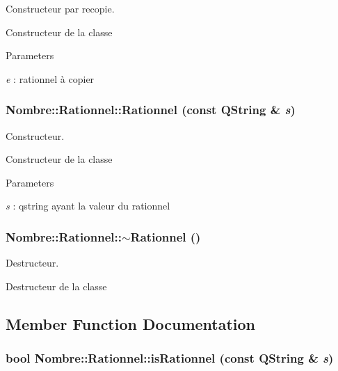 Constructeur par recopie. 

Constructeur de la classe


\begin{DoxyParams}{Parameters}
\item[{\em e}]: rationnel à copier \end{DoxyParams}
\hypertarget{classNombre_1_1Rationnel_a9ceaf1d936e80578441fdd95181932eb}{
\subsubsection[{Rationnel}]{\setlength{\rightskip}{0pt plus 5cm}Nombre::Rationnel::Rationnel (const QString \& {\em s})}}
\label{classNombre_1_1Rationnel_a9ceaf1d936e80578441fdd95181932eb}


Constructeur. 

Constructeur de la classe


\begin{DoxyParams}{Parameters}
\item[{\em s}]: qstring ayant la valeur du rationnel \end{DoxyParams}
\hypertarget{classNombre_1_1Rationnel_a436ac28026acabc38547f594c07ad6dd}{
\subsubsection[{$\sim$Rationnel}]{\setlength{\rightskip}{0pt plus 5cm}Nombre::Rationnel::$\sim$Rationnel ()}}
\label{classNombre_1_1Rationnel_a436ac28026acabc38547f594c07ad6dd}


Destructeur. 

Destructeur de la classe 

\subsection{Member Function Documentation}
\hypertarget{classNombre_1_1Rationnel_a4c6e7150cba3e9ab182361072965f209}{
\subsubsection[{isRationnel}]{\setlength{\rightskip}{0pt plus 5cm}bool Nombre::Rationnel::isRationnel (const QString \& {\em s})}}
\label{classNombre_1_1Rationnel_a4c6e7150cba3e9ab182361072965f209}


